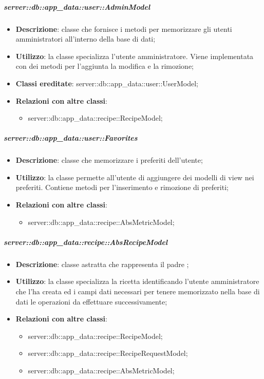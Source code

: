 		\subparagraph{server::db::app\_data::user::AdminModel} %
		\label{subp:server_db_app_data_user_admin_model}
			\begin{itemize}
				\item \textbf{Descrizione}: classe che fornisce i metodi per memorizzare gli utenti amministratori all'interno della base di dati;
				\item \textbf{Utilizzo}: la classe specializza l'utente amministratore. Viene implementata con dei metodi per l'aggiunta la modifica e la rimozione;
				\item \textbf{Classi ereditate}: server::db::app\_data::user::UserModel;
				\item \textbf{Relazioni con altre classi}:
					\begin{itemize}
						\item server::db::app\_data::recipe::RecipeModel;
					\end{itemize}
			\end{itemize}


		\subparagraph{server::db::app\_data::user::Favorites} %
		\label{subp:server_db_app_data_user_favorites}
			\begin{itemize}
				\item \textbf{Descrizione}: classe che memorizzare i preferiti dell'utente;
				\item \textbf{Utilizzo}: la classe  permette all'utente di aggiungere dei modelli di view nei preferiti. Contiene metodi per l'inserimento e rimozione di preferiti;
				\item \textbf{Relazioni con altre classi}:
					\begin{itemize}
						\item server::db::app\_data::recipe::AbsMetricModel;
					\end{itemize}
			\end{itemize}


		\subparagraph{server::db::app\_data::recipe::AbsRecipeModel} %
		\label{subp:server_db_app_data_recipe_absrecipemodel}
			\begin{itemize}
				\item \textbf{Descrizione}: classe astratta che rappresenta il padre ;
				\item \textbf{Utilizzo}: la classe specializza la ricetta identificando l'utente amministratore che l'ha creata ed i campi dati necessari per tenere memorizzato nella base di dati le operazioni da effettuare successivamente;
				\item \textbf{Relazioni con altre classi}:
					\begin{itemize}
						\item server::db::app\_data::recipe::RecipeModel;
						\item server::db::app\_data::recipe::RecipeRequestModel;
						\item server::db::app\_data::recipe::AbsMetricModel;
					\end{itemize}
			\end{itemize}


